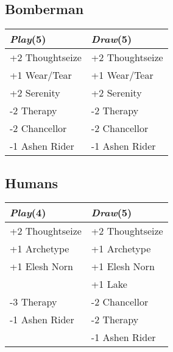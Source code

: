 \documentclass{article}
\renewcommand *\contentsname{Contents}
\begin{document}
\begin{multicols}{2}
\subsection*{Bomberman}
\begin{center}
\begin{tabular}{| l | l |}
\hline
\textit{Play}(5) & \textit{Draw}(5) \\
\hline
\cellcolor[HTML]{BBDDBB}\small{+2 Thoughtseize} & \cellcolor[HTML]{BBDDBB}\small{+2 Thoughtseize}\\
\cellcolor[HTML]{BBDDBB}\small{+1 Wear/Tear} & \cellcolor[HTML]{BBDDBB}\small{+1 Wear/Tear}\\
\cellcolor[HTML]{BBDDBB}\small{+2 Serenity} & \cellcolor[HTML]{BBDDBB}\small{+2 Serenity}\\
\cellcolor[HTML]{DDBBBB}\small{-2 Therapy} & \cellcolor[HTML]{DDBBBB}\small{-2 Therapy}\\
\cellcolor[HTML]{DDBBBB}\small{-2 Chancellor} & \cellcolor[HTML]{DDBBBB}\small{-2 Chancellor}\\
\cellcolor[HTML]{DDBBBB}\small{-1 Ashen Rider} & \cellcolor[HTML]{DDBBBB}\small{-1 Ashen Rider}\\
\hline
\end{tabular}
\end{center}
\subsection*{Humans}
\begin{center}
\begin{tabular}{| l | l |}
\hline
\textit{Play}(4) & \textit{Draw}(5) \\
\hline
\cellcolor[HTML]{BBDDBB}\small{+2 Thoughtseize} & \cellcolor[HTML]{BBDDBB}\small{+2 Thoughtseize}\\
\cellcolor[HTML]{BBDDBB}\small{+1 Archetype} & \cellcolor[HTML]{BBDDBB}\small{+1 Archetype}\\
\cellcolor[HTML]{BBDDBB}\small{+1 Elesh Norn} & \cellcolor[HTML]{BBDDBB}\small{+1 Elesh Norn}\\
 & \cellcolor[HTML]{BBDDBB}\small{+1 Lake}\\
\cellcolor[HTML]{DDBBBB}\small{-3 Therapy} & \cellcolor[HTML]{DDBBBB}\small{-2 Chancellor}\\
\cellcolor[HTML]{DDBBBB}\small{-1 Ashen Rider} & \cellcolor[HTML]{DDBBBB}\small{-2 Therapy}\\
 & \cellcolor[HTML]{DDBBBB}\small{-1 Ashen Rider}\\
\hline
\end{tabular}
\end{center}
\end{multicols}
\end{document}
